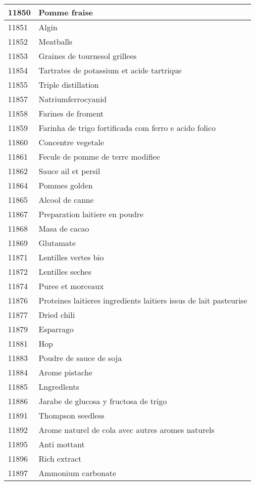 \begin{longtable}{|l|l|}
11850 & Pomme fraise \\ \hline 
11851 & Algin \\ \hline 
11852 & Meatballs \\ \hline 
11853 & Graines de tournesol grillees \\ \hline 
11854 & Tartrates de potassium et acide tartrique \\ \hline 
11855 & Triple distillation \\ \hline 
11857 & Natriumferrocyanid \\ \hline 
11858 & Farines de froment \\ \hline 
11859 & Farinha de trigo fortificada com ferro e acido folico \\ \hline 
11860 & Concentre vegetale \\ \hline 
11861 & Fecule de pomme de terre modifiee \\ \hline 
11862 & Sauce ail et persil \\ \hline 
11864 & Pommes golden \\ \hline 
11865 & Alcool de canne \\ \hline 
11867 & Preparation laitiere en poudre \\ \hline 
11868 & Masa de cacao \\ \hline 
11869 & Glutamate \\ \hline 
11871 & Lentilles vertes bio \\ \hline 
11872 & Lentilles seches \\ \hline 
11874 & Puree et morceaux \\ \hline 
11876 & Proteines laitieres ingredients laitiers issus de lait pasteurise \\ \hline 
11877 & Dried chili \\ \hline 
11879 & Esparrago \\ \hline 
11881 & Hop \\ \hline 
11883 & Poudre de sauce de soja \\ \hline 
11884 & Arome pistache \\ \hline 
11885 & Lngredlents \\ \hline 
11886 & Jarabe de glucosa y fructosa de trigo \\ \hline 
11891 & Thompson seedless \\ \hline 
11892 & Arome naturel de cola avec autres aromes naturels \\ \hline 
11895 & Anti mottant \\ \hline 
11896 & Rich extract \\ \hline 
11897 & Ammonium carbonate \\ \hline 

\end{longtable}
